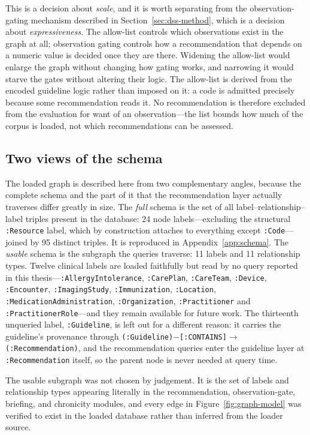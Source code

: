 This is a decision about \emph{scale}, and it is worth separating from the observation-gating
mechanism described in Section~\ref{sec:dss-method}, which is a decision about
\emph{expressiveness}. The allow-list controls which observations exist in the graph at all;
observation gating controls how a recommendation that depends on a numeric value is decided
once they are there. Widening the allow-list would enlarge the graph without changing how
gating works, and narrowing it would starve the gates without altering their logic.
The allow-list is derived from the encoded guideline logic rather than imposed on it: a
code is admitted precisely because some recommendation reads it. No recommendation is
therefore excluded from the evaluation for want of an observation---the list bounds how much
of the corpus is loaded, not which recommendations can be assessed.

\subsection{Two views of the schema}
The loaded graph is described here from two complementary angles, because the complete schema
and the part of it that the recommendation layer actually traverses differ greatly in size.
The \emph{full} schema is the set of all label--relationship--label triples present in the
database: 24 node labels---excluding the structural \texttt{:Resource} label, which by
construction attaches to everything except \texttt{:Code}---joined by 95 distinct triples. It
is reproduced in Appendix~\ref{app:schema}. The \emph{usable} schema is the subgraph the
queries traverse: 11 labels and 11 relationship types. Twelve clinical labels are loaded
faithfully but read by no query reported in this thesis---\texttt{:AllergyIntolerance},
\texttt{:CarePlan}, \texttt{:CareTeam}, \texttt{:Device}, \texttt{:Encounter},
\texttt{:ImagingStudy}, \texttt{:Immunization}, \texttt{:Location},
\texttt{:MedicationAdministration}, \texttt{:Organization}, \texttt{:Practitioner} and
\texttt{:PractitionerRole}---and they remain available for future work. The thirteenth
unqueried label, \texttt{:Guideline}, is left out for a different reason: it carries the
guideline's provenance through
\texttt{(:Guideline)$-$[:CONTAINS]$\rightarrow$(:Recommendation)}, and the recommendation
queries enter the guideline layer at \texttt{:Recommendation} itself, so the parent node is
never needed at query time.

The usable subgraph was not chosen by judgement. It is the set of labels and relationship
types appearing literally in the recommendation, observation-gate, briefing, and chronicity
modules, and every edge in Figure~\ref{fig:graph-model} was verified to exist in the loaded
database rather than inferred from the loader source.

